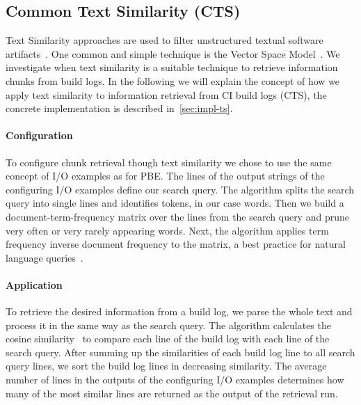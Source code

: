 \documentclass[\myrootdir/main.tex]{subfiles}
\begin{document}
\subsection{Common Text Similarity (CTS)}
\label{sec:expl-ts}
Text Similarity approaches are used to filter unstructured textual software artifacts~\cite{runeson2007detection,marcus2005recovery,antoniol2002recovering,mccarey2006recommending}.
One common and simple technique is the Vector Space Model~\cite{schutze2008introduction}.
We investigate when text similarity is a suitable technique to retrieve information chunks from build logs.
In the following we will explain the concept of how we apply text similarity to information retrieval from CI build logs (CTS), the concrete implementation is described in~\ref{sec:impl-ts}.

\paragraph{Configuration}
To configure chunk retrieval though text similarity we chose to use the same concept of I/O examples as for PBE\@.
The lines of the output strings of the configuring I/O examples define our search query.
The algorithm splits the search query into single lines and identifies tokens, in our case words.
Then we build a document-term-frequency matrix over the lines from the search query and prune very often or very rarely appearing words.
Next, the algorithm applies term frequency inverse document frequency to the matrix, a best practice for natural language queries~\cite{lee1997document}.

\paragraph{Application}
To retrieve the desired information from a build log, we parse the whole text and process it in the same way as the search query.
The algorithm calculates the cosine similarity~\cite{korenius2007principal} to compare each line of the build log with each line of the search query.
After summing up the similarities of each build log line to all search query lines, we sort the build log lines in decreasing similarity.
The average number of lines in the outputs of the configuring I/O examples determines how many of the most similar lines are returned as the output of the retrieval run.
\end{document}

